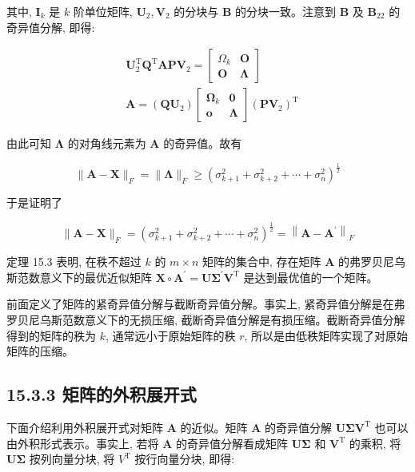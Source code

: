 \documentclass[10pt]{article}
\begin{document}
其中, $\boldsymbol{I}_{k}$ 是 $k$ 阶单位矩阵, $\boldsymbol{U}_{2}, \boldsymbol{V}_{2}$ 的分块与 $\boldsymbol{B}$ 的分块一致。注意到 $\boldsymbol{B}$ 及 $\boldsymbol{B}_{22}$ 的奇异值分解, 即得:


\begin{align*}
& \boldsymbol{U}_{2}^{\mathrm{T}} \boldsymbol{Q}^{\mathrm{T}} \boldsymbol{A} \boldsymbol{P} \boldsymbol{V}_{2}=\left[\begin{array}{cc}
\Omega_{k} & \boldsymbol{O} \\
\boldsymbol{O} & \boldsymbol{\Lambda}
\end{array}\right]  \tag{15.42}\\
& \boldsymbol{A}=\left(\boldsymbol{Q} \boldsymbol{U}_{2}\right)\left[\begin{array}{cc}
\boldsymbol{\Omega}_{k} & \boldsymbol{0} \\
\boldsymbol{o} & \boldsymbol{\Lambda}
\end{array}\right]\left(\boldsymbol{P} \boldsymbol{V}_{2}\right)^{\mathrm{T}} \tag{15.43}
\end{align*}


由此可知 $\boldsymbol{\Lambda}$ 的对角线元素为 $\boldsymbol{A}$ 的奇异值。故有


\begin{equation*}
\|\boldsymbol{A}-\boldsymbol{X}\|_{F}=\|\boldsymbol{\Lambda}\|_{F} \geqslant\left(\sigma_{k+1}^{2}+\sigma_{k+2}^{2}+\cdots+\sigma_{n}^{2}\right)^{\frac{1}{2}} \tag{15.44}
\end{equation*}


于是证明了

$$
\|\boldsymbol{A}-\boldsymbol{X}\|_{F}=\left(\sigma_{k+1}^{2}+\sigma_{k+2}^{2}+\cdots+\sigma_{n}^{2}\right)^{\frac{1}{2}}=\left\|\boldsymbol{A}-\boldsymbol{A}^{\prime}\right\|_{F}
$$

定理 15.3 表明, 在秩不超过 $k$ 的 $m \times n$ 矩阵的集合中, 存在矩阵 $\boldsymbol{A}$ 的弗罗贝尼乌斯范数意义下的最优近似矩阵 $\boldsymbol{X} \circ \boldsymbol{A}^{\prime}=\boldsymbol{U} \boldsymbol{\Sigma}^{\prime} \boldsymbol{V}^{\mathrm{T}}$ 是达到最优值的一个矩阵。

前面定义了矩阵的紧奇异值分解与截断奇异值分解。事实上, 紧奇异值分解是在弗罗贝尼乌斯范数意义下的无损压缩, 截断奇异值分解是有损压缩。截断奇异值分解得到的矩阵的秩为 $k$, 通常远小于原始矩阵的秩 $r$, 所以是由低秩矩阵实现了对原始矩阵的压缩。

\subsection*{15.3.3 矩阵的外积展开式}
下面介绍利用外积展开式对矩阵 $\boldsymbol{A}$ 的近似。矩阵 $\boldsymbol{A}$ 的奇异值分解 $\boldsymbol{U} \boldsymbol{\Sigma} \boldsymbol{V}^{\mathrm{T}}$ 也可以由外积形式表示。事实上, 若将 $\boldsymbol{A}$ 的奇异值分解看成矩阵 $\boldsymbol{U} \boldsymbol{\Sigma}$ 和 $\boldsymbol{V}^{\mathrm{T}}$ 的乘积, 将 $\boldsymbol{U} \boldsymbol{\Sigma}$ 按列向量分块, 将 $V^{\mathrm{T}}$ 按行向量分块, 即得:
\end{document}
